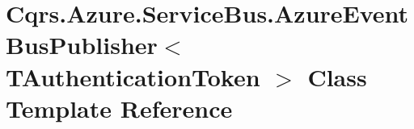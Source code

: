 \hypertarget{classCqrs_1_1Azure_1_1ServiceBus_1_1AzureEventBusPublisher}{}\section{Cqrs.\+Azure.\+Service\+Bus.\+Azure\+Event\+Bus\+Publisher$<$ T\+Authentication\+Token $>$ Class Template Reference}
\label{classCqrs_1_1Azure_1_1ServiceBus_1_1AzureEventBusPublisher}
